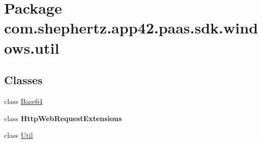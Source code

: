 \hypertarget{namespacecom_1_1shephertz_1_1app42_1_1paas_1_1sdk_1_1windows_1_1util}{\section{Package com.\+shephertz.\+app42.\+paas.\+sdk.\+windows.\+util}
\label{namespacecom_1_1shephertz_1_1app42_1_1paas_1_1sdk_1_1windows_1_1util}
}
\subsection*{Classes}
\begin{DoxyCompactItemize}
\item 
class \hyperlink{classcom_1_1shephertz_1_1app42_1_1paas_1_1sdk_1_1windows_1_1util_1_1_base64}{Base64}
\item 
class {\bfseries Http\+Web\+Request\+Extensions}
\item 
class \hyperlink{classcom_1_1shephertz_1_1app42_1_1paas_1_1sdk_1_1windows_1_1util_1_1_util}{Util}
\end{DoxyCompactItemize}
